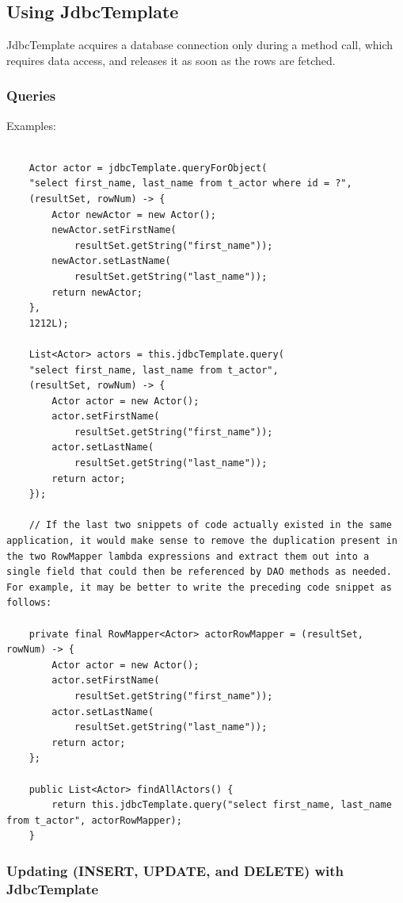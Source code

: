 \documentclass{scrartcl}
\begin{document}
\subsection{Using JdbcTemplate}

JdbcTemplate acquires a database connection only during a method call, which requires data access, and releases it as soon as the rows are fetched.

\subsubsection{Queries}

Examples:

\begin{lstlisting}

    Actor actor = jdbcTemplate.queryForObject(
    "select first_name, last_name from t_actor where id = ?",
    (resultSet, rowNum) -> {
        Actor newActor = new Actor();
        newActor.setFirstName(
            resultSet.getString("first_name"));
        newActor.setLastName(
            resultSet.getString("last_name"));
        return newActor;
    },
    1212L);

    List<Actor> actors = this.jdbcTemplate.query(
    "select first_name, last_name from t_actor",
    (resultSet, rowNum) -> {
        Actor actor = new Actor();
        actor.setFirstName(
            resultSet.getString("first_name"));
        actor.setLastName(
            resultSet.getString("last_name"));
        return actor;
    });

    // If the last two snippets of code actually existed in the same application, it would make sense to remove the duplication present in the two RowMapper lambda expressions and extract them out into a single field that could then be referenced by DAO methods as needed. For example, it may be better to write the preceding code snippet as follows:

    private final RowMapper<Actor> actorRowMapper = (resultSet, rowNum) -> {
        Actor actor = new Actor();
        actor.setFirstName(
            resultSet.getString("first_name"));
        actor.setLastName(
            resultSet.getString("last_name"));
        return actor;
    };

    public List<Actor> findAllActors() {
        return this.jdbcTemplate.query("select first_name, last_name from t_actor", actorRowMapper);
    }
\end{lstlisting}

\subsubsection{Updating (INSERT, UPDATE, and DELETE) with JdbcTemplate}
\end{document}
